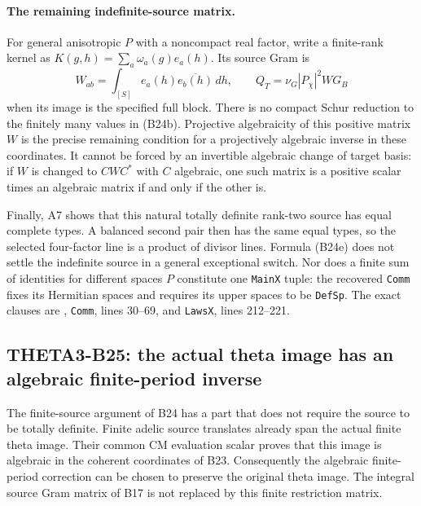 \documentclass[11pt]{article}
\theoremstyle{definition}\newtheorem{definition}[theorem]{Definition}\newtheorem{remark}[theorem]{Remark}
\begin{document}
\paragraph{The remaining indefinite-source matrix.}
For general anisotropic $P$ with a
noncompact real factor, write a finite-rank
kernel as $K(g,h)=\sum_a\omega_a(g)e_a(h)$.
Its source Gram is
\[
 W_{ab}=\int_{[S]}e_a(h)\overline{e_b(h)}\,dh,
 \qquad Q_T=\nu_G|P_\chi|^2W G_B
 \tag{B24f}
\]
when its image is the specified full block.
There is no compact Schur reduction to
the finitely many values in (B24b).
Projective algebraicity of this positive
matrix $W$ is the precise remaining
condition for a projectively algebraic
inverse in these coordinates.  It cannot
be forced by an invertible algebraic
change of target basis: if $W$ is changed
to $CWC^*$ with $C$ algebraic, one such
matrix is a positive scalar times an
algebraic matrix if and only if the
other is.

Finally, A7 shows that this natural
totally definite rank-two source has
equal complete types.  A balanced second
pair then has the same equal types, so
the selected four-factor line is a
product of divisor lines.  Formula
(B24e) does not settle the indefinite
source in a general exceptional switch.
Nor does a finite sum of identities
for different spaces $P$ constitute
one \texttt{MainX} tuple: the recovered
\texttt{Comm} fixes its Hermitian spaces
and requires its upper spaces to be
\texttt{DefSp}.  The exact clauses are
,
\texttt{Comm}, lines 30--69, and
\texttt{LawsX}, lines 212--221.


\subsection{THETA3-B25: the actual theta image has an algebraic finite-period inverse}\label{B25}

The finite-source argument of B24 has a part that does not
require the source to be totally definite.  Finite adelic
source translates already span the actual finite theta
image.  Their common CM evaluation scalar proves that
this image is algebraic in the coherent coordinates of
B23.  Consequently the algebraic finite-period correction
can be chosen to preserve the original theta image.
The integral source Gram matrix of B17 is not replaced
by this finite restriction matrix.
\end{document}
